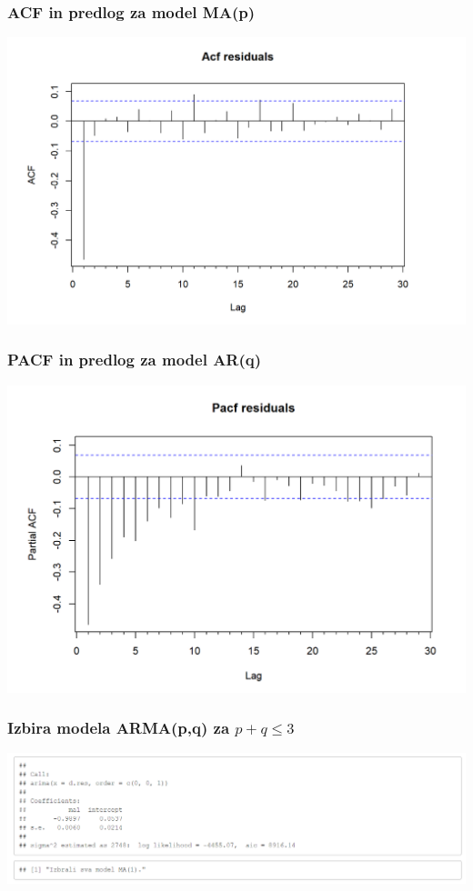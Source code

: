 \documentclass[10pt]{beamer}
\begin{document}
\begin{frame}
\frametitle{ACF in predlog za model MA(p)}
\includegraphics[width=1\textwidth]{AcfA.png}
\end{frame}

\begin{frame}
\frametitle{PACF in predlog za model AR(q)}
\includegraphics[width=1\textwidth]{PacfA.png}
\end{frame}

\begin{frame}
\frametitle{Izbira modela ARMA(p,q) za $ p + q \le 3$}
\includegraphics[width=1\textwidth]{ModelA.png}
\end{frame}
\end{document}
